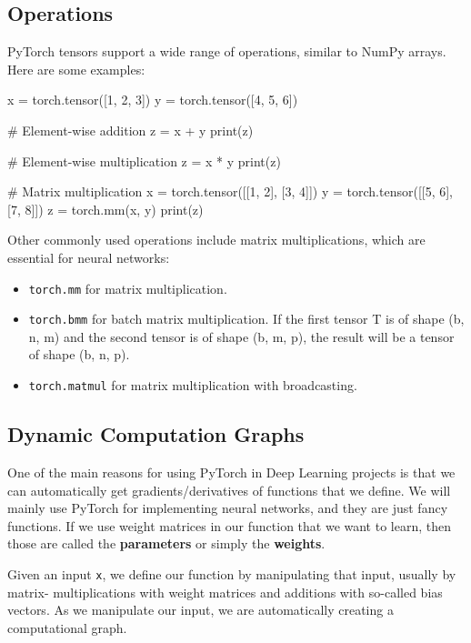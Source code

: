 \subsection*{Operations}

PyTorch tensors support a wide range of operations, similar to NumPy arrays. Here are some examples:

\begin{codeblock}[language=python]
    x = torch.tensor([1, 2, 3])
    y = torch.tensor([4, 5, 6])

    # Element-wise addition
    z = x + y
    print(z)

    # Element-wise multiplication
    z = x * y
    print(z)

    # Matrix multiplication
    x = torch.tensor([[1, 2], [3, 4]])
    y = torch.tensor([[5, 6], [7, 8]])
    z = torch.mm(x, y)
    print(z)
\end{codeblock}

Other commonly used operations include matrix multiplications, which are essential for neural
networks:
\begin{itemize}
    \item \texttt{torch.mm} for matrix multiplication.
    \item \texttt{torch.bmm} for batch matrix multiplication. If the first tensor T is of shape (b, n, m) and the second tensor is of shape (b, m, p), the result will be a tensor of shape (b, n, p).
    \item \texttt{torch.matmul} for matrix multiplication with broadcasting.
\end{itemize}

\subsection*{Dynamic Computation Graphs}

One of the main reasons for using PyTorch in Deep Learning projects is that we can automatically
get gradients/derivatives of functions that we define.
We will mainly use PyTorch for implementing neural networks, and they are just fancy functions. If
we use weight matrices in our function that we want to learn, then those are called the
\textbf{parameters} or simply the \textbf{weights}.

Given an input \texttt{x}, we define our function by manipulating that input, usually by matrix-
multiplications with weight matrices and additions with so-called bias vectors. As we manipulate
our input, we are automatically creating a computational graph.


